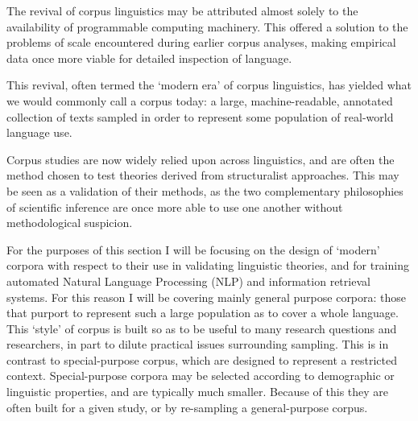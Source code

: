 The revival of corpus linguistics may be attributed almost solely to the availability of programmable computing machinery.  This offered a solution to the problems of scale encountered during earlier corpus analyses, making empirical data once more viable for detailed inspection of language.

This revival, often termed the `modern era' of corpus linguistics, has yielded what we would commonly call a corpus today: a large, machine-readable, annotated collection of texts sampled in order to represent some population of real-world language use.

Corpus studies are now widely relied upon across linguistics, and are often the method chosen to test theories derived from structuralist approaches.  This may be seen as a validation of their methods, as the two complementary philosophies of scientific inference are once more able to use one another without methodological suspicion.

For the purposes of this section I will be focusing on the design of `modern' corpora with respect to their use in validating linguistic theories, and for training automated Natural Language Processing (NLP) and information retrieval systems.  For this reason I will be covering mainly general purpose corpora: those that purport to represent such a large population as to cover a whole language.  This `style' of corpus is built so as to be useful to many research questions and researchers, in part to dilute practical issues surrounding sampling.  This is in contrast to special-purpose corpus, which are designed to represent a restricted context.  Special-purpose corpora may be selected according to demographic or linguistic properties, and are typically much smaller.  Because of this they are often built for a given study, or by re-sampling a general-purpose corpus.









